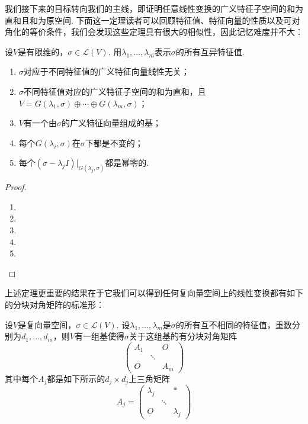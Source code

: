 我们接下来的目标转向我们的主线，即证明任意线性变换的广义特征子空间的和为直和且和为原空间. 下面这一定理读者可以回顾特征值、特征向量的性质以及可对角化的等价条件，我们会发现这些定理具有很大的相似性，因此记忆难度并不大：
\begin{theorem} \label{thm:20:广义特征性质}
    设$V$是有限维的，$\sigma\in \mathcal{L}(V)$. 用$\lambda_1,\ldots,\lambda_m$表示$\sigma$的所有互异特征值.
    \begin{enumerate}[label=(\arabic*)]
        \item $\sigma$对应于不同特征值的广义特征向量线性无关；

        \item \label{item:20:广义特征性质:2}
              $\sigma$不同特征值对应的广义特征子空间的和为直和，且$V=G(\lambda_1,\sigma)\oplus\cdots\oplus
                  G(\lambda_m,\sigma)$；

        \item $V$有一个由$\sigma$的广义特征向量组成的基；

        \item 每个$G(\lambda_i,\sigma)$在$\sigma$下都是不变的；

        \item \label{item:20:广义特征性质:5}
              每个$(\sigma-\lambda_j I)\vert_{G(\lambda_j,\sigma)}$都是幂零的.
    \end{enumerate}
\end{theorem}

\begin{proof}
    \begin{enumerate}
        \item

        \item

        \item

        \item

        \item
    \end{enumerate}
\end{proof}

上述定理更重要的结果在于它我们可以得到任何复向量空间上的线性变换都有如下的分块对角矩阵的标准形：
\begin{theorem}
    设$V$是复向量空间，$\sigma\in \mathcal{L}(V)$. 设$\lambda_1,\ldots,\lambda_m$是$\sigma$的所有互不相同的特征值，重数分别为$d_1,\ldots,d_m$，则$V$有一组基使得$\sigma$关于这组基的有分块对角矩阵
    \[\begin{pmatrix}
            A_1 &  & O \\  & \ddots &  \\ O &  & A_m
        \end{pmatrix}\]
    其中每个$A_j$都是如下所示的$d_j\times d_j$上三角矩阵
    \[A_j=\begin{pmatrix}
            \lambda_j &  & * \\  & \ddots &  \\ O &  & \lambda_j
        \end{pmatrix}\]
\end{theorem}

